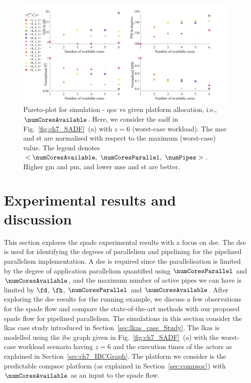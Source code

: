\begin{figure}[ht]
\centerline{
    \includegraphics[width=\textwidth]{images/plot_DSE_6RoI_2.jpg}
    }
    \caption{Pareto-plot for simulation - \gls{qoc} vs given platform allocation, i.e., $\numCoresAvailable$. Here, we consider the \gls{sadf} in Fig.~\ref{fig:ch7_SADF}~(a) with $z=6$ (worst-case workload). The \gls{mse} and \gls{st} are normalised with respect to the maximum (worst-case) value. The legend denotes $<\numCoresAvailable,\ \numCoresParallel,\ \numPipes>$. Higher \gls{gm} and \gls{pm}, and lower \gls{mse} and \gls{st} are better.}
    \label{fig:ch7_Pareto}
    \vspace{-1em}
\end{figure}

\section{Experimental results and discussion}
\label{sec:ch7_ExperimentalResults}
This section explores the \gls{spade} experimental results with a focus on \gls{dse}.
The \gls{dse} is used for identifying the degrees of parallelism and pipelining for the pipelined parallelism implementation.
A \gls{dse} is required since the parallelisation is limited by the degree of application parallelism quantified using $\numCoresParallel$ and $\numCoresAvailable$, and the maximum number of active pipes we can have is limited by $\fd$, $\fh$, $\numCoresParallel$ and $\numCoresAvailable$.
After exploring the \gls{dse} results for the running example, we discuss a few observations for the \gls{spade} flow and compare the state-of-the-art methods with our proposed \gls{spade} flow for pipelined parallelism. The simulations in this section consider the \gls{lkas} case study introduced in Section~\ref{sec:lkas_case_Study}. The \gls{lkas} is modelled using the \gls{ibc} graph given in Fig.~\ref{fig:ch7_SADF}~(a) with the worst-case workload scenario having $z=6$ and the execution times of the actors as explained in Section~\ref{sec:ch7_IBCGraph}. The platform we consider is the predictable \gls{compsoc} platform (as explained in Section~\ref{sec:compsoc}) with $\numCoresAvailable$ as an input to the \gls{spade} flow.

